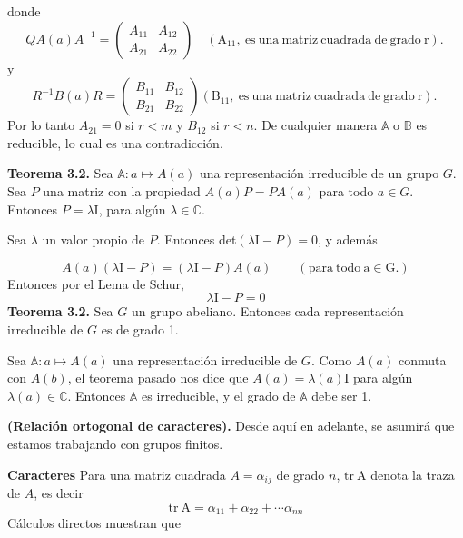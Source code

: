 \documentclass[12pt]{book}
\theoremstyle{definition}
\newcounter{in}
\newcounter{ini}
\begin{document}
donde
\begin{equation*}
  QA(a)A^{-1}=
  \begin{pmatrix}
    A_{11} & A_{12} \\ 
    A_{21} & A_{22}
  \end{pmatrix} \quad \mathrm{(A_{11},\ es\ una\ matriz\ cuadrada\ de\ grado\ r).\ }
\end{equation*}  
y
\begin{equation*}
  R^{-1}B(a)R=
  \begin{pmatrix}
    B_{11} & B_{12} \\ 
    B_{21} & B_{22}
  \end{pmatrix} \mathrm{(B_{11},\ es\ una\ matriz\ cuadrada\ de\ grado\ r).\ }
\end{equation*}  
Por lo tanto $A_{21}=0$ si $r<m$ y $B_{12}$ si $r<n$. De cualquier
manera $\mathbb{A}$ o $\mathbb{B}$ es reducible, lo cual es una
contradicción.

\textbf{Teorema 3.2.} Sea
$\mathbb{A} \colon a \mapsto A\left(a\right)$ una representación
irreducible de un grupo $G$. Sea $P$ una matriz con la propiedad
$A(a)P=PA(a)$ para todo $a \in G$. Entonces $P=\lambda \mathrm{I}$,
para algún $\lambda \in \mathbb{C}$.

Sea $\lambda$ un valor propio de $P$. Entonces
det$(\lambda \mathrm{I} - P)=0$, y además

\begin{equation*}
  A(a)(\lambda \mathrm{I} - P)=(\lambda \mathrm{I} - P)A(a) \qquad \mathrm{(para\ todo\ a \in G.)}
\end{equation*}
Entonces por el Lema de Schur,
\begin{equation*}
  \lambda \mathrm{I}-P=0
\end{equation*}
\textbf{Teorema 3.2.} Sea $G$ un grupo abeliano. Entonces cada
representación irreducible de $G$ es de grado 1.

Sea $\mathbb{A}\colon a \mapsto A\left(a\right)$ una representación
irreducible de $G$. Como $A(a)$ conmuta con $A(b)$, el teorema pasado
nos dice que $A(a)=\lambda(a) \mathrm{I}$ para algún
$\lambda(a) \in \mathbb{C}$. Entonces $\mathbb{A}$ es irreducible, y
el grado de $\mathbb{A}$ debe ser 1.

\textbf{(Relación ortogonal de caracteres).} Desde aquí en adelante,
se asumirá que estamos trabajando con grupos finitos.

\textbf{Caracteres} Para una matriz cuadrada $A=\alpha_{ij}$ de grado
$n$, $\mathrm{tr\ A}$ denota la traza de $A$, es decir
\begin{equation*}
  \mathrm{tr\ A}=\alpha_{11}+\alpha_{22}+ \cdots \alpha_{nn}
\end{equation*}
Cálculos directos muestran que
\end{document}
